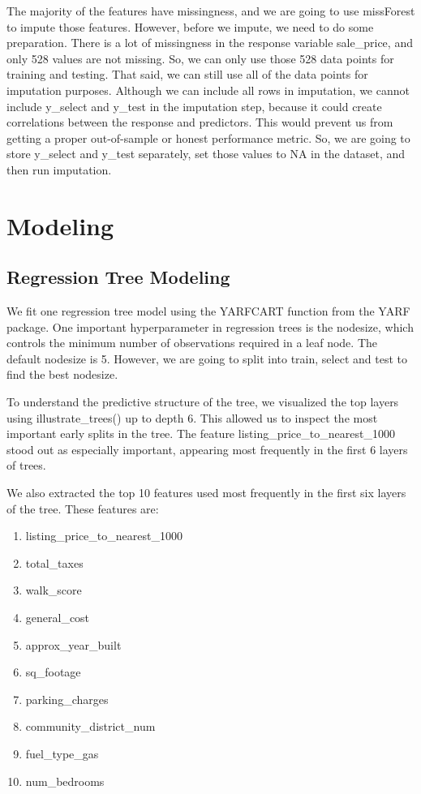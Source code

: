 \documentclass[12pt]{article}
\begin{document}
The majority of the features have missingness, and we are going to use missForest to impute those features. However, before we impute, we need to do some preparation. There is a lot of missingness in the response variable sale\_price, and only 528 values are not missing. So, we can only use those 528 data points for training and testing. That said, we can still use all of the data points for imputation purposes. Although we can include all rows in imputation, we cannot include y\_select and y\_test in the imputation step, because it could create correlations between the response and predictors. This would prevent us from getting a proper out-of-sample or honest performance metric. So, we are going to store y\_select and y\_test separately, set those values to NA in the dataset, and then run imputation.

\section{Modeling}

\subsection{Regression Tree Modeling}

We fit one regression tree model using the YARFCART function from the YARF package. One important hyperparameter in regression trees is the nodesize, which controls the minimum number of observations required in a leaf node. The default nodesize is 5. However, we are going to split into train, select and test to find the best nodesize.

To understand the predictive structure of the tree, we visualized the top layers using illustrate\_trees() up to depth 6. This allowed us to inspect the most important early splits in the tree. The feature listing\_price\_to\_nearest\_1000 stood out as especially important, appearing most frequently in the first 6 layers of trees.

We also extracted the top 10 features used most frequently in the first six layers of the tree. These features are:
\begin{enumerate}
    \item listing\_price\_to\_nearest\_1000
    \item total\_taxes
    \item walk\_score
    \item general\_cost
    \item approx\_year\_built
        \item sq\_footage
        \item parking\_charges
        \item community\_district\_num
    \item fuel\_type\_gas
    \item num\_bedrooms
\end{enumerate}
\end{document}
